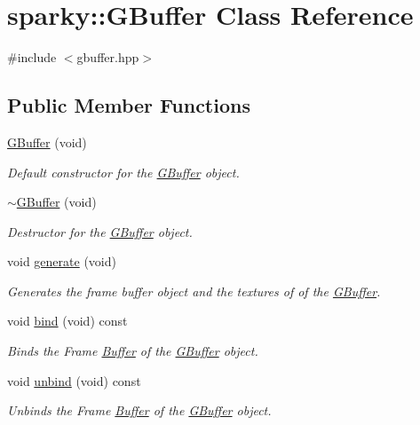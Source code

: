 \hypertarget{classsparky_1_1_g_buffer}{}\section{sparky\+:\+:G\+Buffer Class Reference}
\label{classsparky_1_1_g_buffer}


{\ttfamily \#include $<$gbuffer.\+hpp$>$}

\subsection*{Public Member Functions}
\begin{DoxyCompactItemize}
\item 
\hyperlink{classsparky_1_1_g_buffer_abb6414c6008f4cf73218caa17d40f9bb}{G\+Buffer} (void)
\begin{DoxyCompactList}\small\item\em Default constructor for the \hyperlink{classsparky_1_1_g_buffer}{G\+Buffer} object. \end{DoxyCompactList}\item 
\hyperlink{classsparky_1_1_g_buffer_a83b6c8d215e8f9eb1bbcda36bd02a322}{$\sim$\+G\+Buffer} (void)
\begin{DoxyCompactList}\small\item\em Destructor for the \hyperlink{classsparky_1_1_g_buffer}{G\+Buffer} object. \end{DoxyCompactList}\item 
void \hyperlink{classsparky_1_1_g_buffer_a71c5f2a4dc35f05a3e978fa20ba4564f}{generate} (void)
\begin{DoxyCompactList}\small\item\em Generates the frame buffer object and the textures of of the \hyperlink{classsparky_1_1_g_buffer}{G\+Buffer}. \end{DoxyCompactList}\item 
void \hyperlink{classsparky_1_1_g_buffer_a832f461bb679e535dbd4a23f583192bf}{bind} (void) const 
\begin{DoxyCompactList}\small\item\em Binds the Frame \hyperlink{classsparky_1_1_buffer}{Buffer} of the \hyperlink{classsparky_1_1_g_buffer}{G\+Buffer} object. \end{DoxyCompactList}\item 
void \hyperlink{classsparky_1_1_g_buffer_a5bac7c40c04e0a558387509b1dda46fa}{unbind} (void) const 
\begin{DoxyCompactList}\small\item\em Unbinds the Frame \hyperlink{classsparky_1_1_buffer}{Buffer} of the \hyperlink{classsparky_1_1_g_buffer}{G\+Buffer} object. \end{DoxyCompactList}\item 

\end{DoxyCompactItemize}
